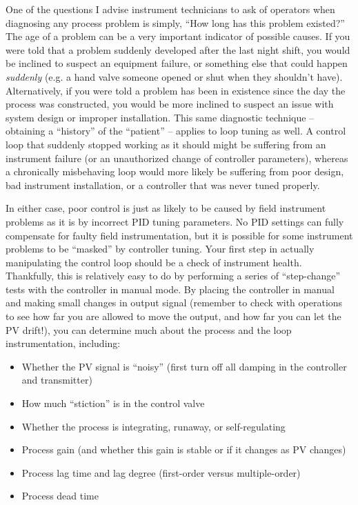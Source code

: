 One of the questions I advise instrument technicians to ask of operators when diagnosing any process problem is simply, ``How long has this problem existed?''  The age of a problem can be a very important indicator of possible causes.  If you were told that a problem suddenly developed after the last night shift, you would be inclined to suspect an equipment failure, or something else that could happen \textit{suddenly} (e.g. a hand valve someone opened or shut when they shouldn't have).  Alternatively, if you were told a problem has been in existence since the day the process was constructed, you would be more inclined to suspect an issue with system design or improper installation.  This same diagnostic technique -- obtaining a ``history'' of the ``patient'' -- applies to loop tuning as well.  A control loop that suddenly stopped working as it should might be suffering from an instrument failure (or an unauthorized change of controller parameters), whereas a chronically misbehaving loop would more likely be suffering from poor design, bad instrument installation, or a controller that was never tuned properly.

In either case, poor control is just as likely to be caused by field instrument problems as it is by incorrect PID tuning parameters.  No PID settings can fully compensate for faulty field instrumentation, but it is possible for some instrument problems to be ``masked'' by controller tuning.  Your first step in actually manipulating the control loop should be a check of instrument health.  Thankfully, this is relatively easy to do by performing a series of ``step-change'' tests with the controller in manual mode.  By placing the controller in manual and making small changes in output signal (remember to check with operations to see how far you are allowed to move the output, and how far you can let the PV drift!), you can determine much about the process and the loop instrumentation, including:

\begin{itemize}
\item Whether the PV signal is ``noisy'' (first turn off all damping in the controller and transmitter)
\item How much ``stiction'' is in the control valve
\item Whether the process is integrating, runaway, or self-regulating
\item Process gain (and whether this gain is stable or if it changes as PV changes)
\item Process lag time and lag degree (first-order versus multiple-order)
\item Process dead time
\end{itemize}

